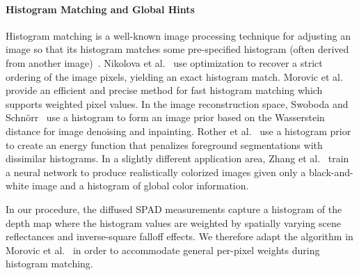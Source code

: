 \paragraph{Histogram Matching and Global Hints}
%
Histogram matching is a well-known image processing technique for adjusting an image so that its histogram matches some pre-specified histogram (often derived from another image)~\cite{gonzales1977gray,Gonzalez2008}. Nikolova et al.~\cite{Nikolova2013} use optimization to recover a strict ordering of the image pixels, yielding an exact histogram match. Morovic et al.~\cite{Morovic2002} provide an efficient and precise method for fast histogram matching which supports weighted pixel values. In the image reconstruction space, Swoboda and Schn\"orr~\cite{Swoboda2013} use a histogram to form an image prior based on the Wasserstein distance for image denoising and inpainting. Rother et al.~\cite{Rother2006} use a histogram prior to create an energy function that penalizes foreground segmentations with dissimilar histograms. In a slightly different application area, Zhang et al.~\cite{Zhang2017} train a neural network to produce realistically colorized images given only a black-and-white image and a histogram of global color information.

In our procedure, the diffused SPAD measurements capture a histogram of the depth map where the histogram values are weighted by spatially varying scene reflectances and inverse-square falloff effects. We therefore adapt the algorithm in Morovic et al.~\cite{Morovic2002} in order to accommodate general per-pixel weights during histogram matching.

%


